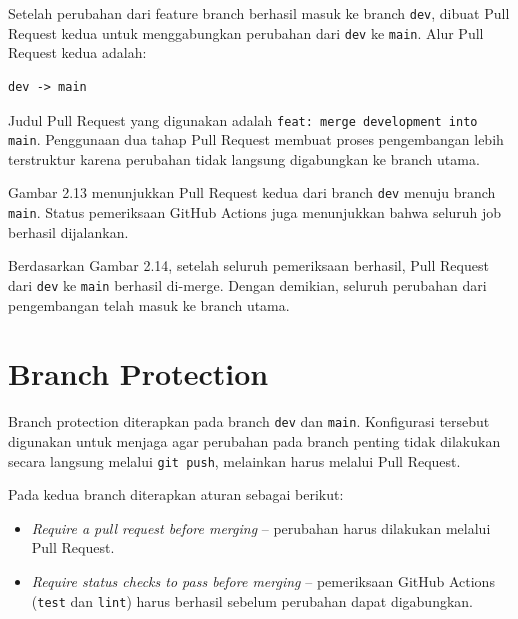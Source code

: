 Setelah perubahan dari feature branch berhasil masuk ke branch \texttt{dev}, dibuat Pull Request kedua untuk menggabungkan perubahan dari \texttt{dev} ke \texttt{main}. Alur Pull Request kedua adalah:

\begin{lstlisting}
dev -> main
\end{lstlisting}

Judul Pull Request yang digunakan adalah \texttt{feat: merge development into main}. Penggunaan dua tahap Pull Request membuat proses pengembangan lebih terstruktur karena perubahan tidak langsung digabungkan ke branch utama.


Gambar 2.13 menunjukkan Pull Request kedua dari branch \texttt{dev} menuju branch \texttt{main}. Status pemeriksaan GitHub Actions juga menunjukkan bahwa seluruh job berhasil dijalankan.


Berdasarkan Gambar 2.14, setelah seluruh pemeriksaan berhasil, Pull Request dari \texttt{dev} ke \texttt{main} berhasil di-merge. Dengan demikian, seluruh perubahan dari pengembangan telah masuk ke branch utama.

\section{Branch Protection}

Branch protection diterapkan pada branch \texttt{dev} dan \texttt{main}. Konfigurasi tersebut digunakan untuk menjaga agar perubahan pada branch penting tidak dilakukan secara langsung melalui \texttt{git push}, melainkan harus melalui Pull Request.

Pada kedua branch diterapkan aturan sebagai berikut:
\begin{itemize}
    \item \textit{Require a pull request before merging} -- perubahan harus dilakukan melalui Pull Request.
    \item \textit{Require status checks to pass before merging} -- pemeriksaan GitHub Actions (\texttt{test} dan \texttt{lint}) harus berhasil sebelum perubahan dapat digabungkan.
\end{itemize}

